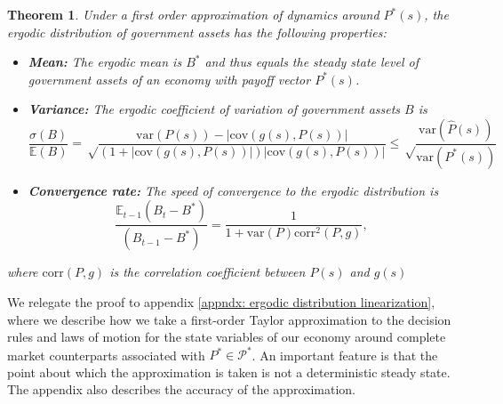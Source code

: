 \documentclass[thmsb,11pt]{article}
\newtheorem{theorem}{Theorem}
\newcommand{\EE}{\mathbb E}
\newcommand{\var}{\mathrm{var}}
\newcommand{\cov}{\mathrm{cov}}
\newcommand{\corr}{\mathrm{corr}}
\begin{document}
\begin{theorem}
\label{thm: rep agent linear policies}
Under a  first order approximation of dynamics around $P^*(s)$, the ergodic distribution of government assets has the following properties:
\begin{itemize}
 \item \textbf{Mean:} The ergodic mean is $B^*$ and thus equals the steady state level of government assets  of an economy with payoff vector $P^*(s)$.
 \item \textbf{Variance:} The ergodic coefficient of variation of government assets $B$ is
  \[
    \frac{\sigma(B)}{\mathbb E(B)} = \sqrt\frac{\var(P(s)) - |\cov(g(s),P(s))|}{(1+|\cov(g(s),P(s))|)|\cov(g(s),P(s))|}\leq\sqrt\frac{\var(\hat{P}(s))}{\var(P^*(s))}
  \]
  \item \textbf{Convergence rate:} The speed of convergence to the ergodic distribution is
  \[
    \frac{\EE_{t-1}(B_t-B^*)}{(B_{t-1} - B^*)} = \frac1{1+ \var(P)\corr^2(P,g)},
  \]
\end{itemize}
where $\corr(P,g)$ is the correlation coefficient between $P(s)$ and $g(s)$
\end{theorem}

 We relegate the proof to appendix  \ref{appndx: ergodic distribution linearization}, where we describe how %
we take a first-order Taylor approximation to the decision rules and laws of motion for the state variables of our
economy around complete market counterparts associated with $P^*\in \mathcal{P}^*$.
An important feature is that the point about which the  approximation is taken is not a deterministic steady state.
The appendix also describes the accuracy of the approximation.
\end{document}
